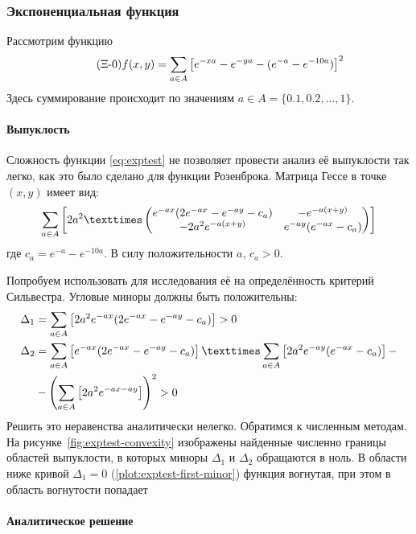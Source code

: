 \subsubsection{Экспоненциальная функция}
\label{sec:exptest}

Рассмотрим функцию
\begin{equation}
  \label{eq:exptest}
  \tag{$\Xi$-\theequation}
  f(x, y) = \sum\limits_{a\in A}\left [
    e^{-xa}-e^{-ya}-(e^{-a}-e^{-10a})\right ]^2
\end{equation}
Здесь суммирование происходит по значениям $a \in A =\{0.1, 0.2, \dotsc, 1\}$.

\paragraph{Выпуклость}

Сложность функции \eqref{eq:exptest} не позволяет провести анализ её
выпуклости так легко, как это было сделано для функции Розенброка.
Матрица Гессе в точке $(x, y)$ имеет вид:
\begin{equation}
  \label{eq:exptest-hess}
  \suml_{a\in A}\left[2a^2×
  \begin{pmatrix}
    e^{-ax}(2e^{-ax}-e^{-ay}-c_a) & -e^{-a(x+y)} \\
    -2a^2e^{-a(x+y)} & e^{-ay}(e^{-ax}-c_a)
  \end{pmatrix}\right]
\end{equation}
где $c_a = e^{-a}-e^{-10a}$. В силу положительности $a$, $c_a>0$.

Попробуем использовать для исследования её на определённость критерий
Сильвестра. Угловые миноры должны быть положительны:
\begin{align*}
  \Delta_1 &= \suml_{a\in A}
  \left[ 2a^2e^{-ax}(2e^{-ax}-e^{-ay}-c_a) \right] > 0\\
  \Delta_2 &= \suml_{a\in A}
  \left[ e^{-ax}(2e^{-ax}-e^{-ay}-c_a) \right]×
  \suml_{a\in A}
  \left[ 2a^2e^{-ay}(e^{-ax}-c_a) \right]-\\
  &-\left(\suml_{a\in A}
  \left[ 2a^2e^{-ax-ay} \right] \right)^2
  > 0
\end{align*}
Решить это неравенства аналитически нелегко. Обратимся к численным
методам. На рисунке \ref{fig:exptest-convexity} изображены найденные
численно границы областей выпуклости, в которых миноры $\Delta_1$ и
$\Delta_2$ обращаются в ноль. В области ниже кривой $\Delta_1=0$
(\ref{plot:exptest-first-minor}) функция вогнутая, при этом в область
вогнутости попадает

\paragraph{Аналитическое решение}

